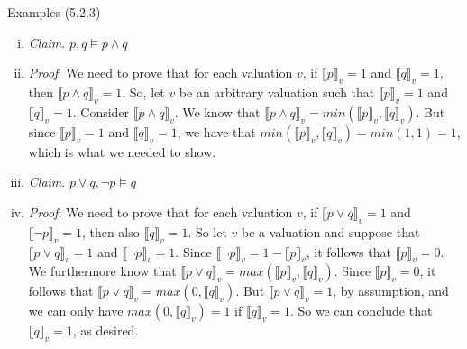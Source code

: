 \documentclass[../slides.tex]{subfiles}
\begin{document}
\begin{frame}{Examples (5.2.3)}

	\begin{enumerate}[(i)]
		
			\item \emph{Claim}. $p,q\vDash p\land q$
			
			\item[] \emph{Proof}: We need to prove that for each valuation $v$, if $\llbracket p\rrbracket_v=1$ and $\llbracket q\rrbracket_v=1$, then $\llbracket p\land q\rrbracket_v=1$. So, let $v$ be an arbitrary valuation such that $\llbracket p\rrbracket_v=1$ and $\llbracket q\rrbracket_v=1$. Consider $\llbracket p\land q\rrbracket_v$. We know that $\llbracket p\land q\rrbracket_v=min(\llbracket p\rrbracket_v, \llbracket q\rrbracket_v)$. But since $\llbracket p\rrbracket_v=1$ and $\llbracket q\rrbracket_v=1$, we have that $min(\llbracket p\rrbracket_v, \llbracket q\rrbracket_v)=min(1,1)=1$, which is what we needed to show.
		
		\setcounter{enumi}{3}
		\item \emph{Claim}. $p\lor q, \neg p\vDash q$
			
		\item[] \emph{Proof}: We need to prove that for each valuation $v$, if $\llbracket p\lor q\rrbracket_v=1$ and $\llbracket \neg p\rrbracket_v=1$, then also $\llbracket q\rrbracket_v=1$. So let $v$ be a valuation and suppose that $\llbracket p\lor q\rrbracket_v=1$ and $\llbracket \neg p\rrbracket_v=1$. Since $\llbracket \neg p\rrbracket_v=1-\llbracket p\rrbracket_v$, it follows that $\llbracket p\rrbracket_v=0$. We furthermore know that $\llbracket p\lor q\rrbracket_v=max(\llbracket p\rrbracket_v, \llbracket q\rrbracket_v)$. Since  $\llbracket p\rrbracket_v=0$, it follows that $\llbracket p\lor q\rrbracket_v=max(0, \llbracket q\rrbracket_v)$. But $\llbracket p\lor q\rrbracket_v=1$, by assumption, and we can only have $max(0, \llbracket q\rrbracket_v)=1$ if $\llbracket q\rrbracket_v=1$. So we can conclude that $\llbracket q\rrbracket_v=1$, as desired.


\end{enumerate}

\end{frame}
\end{document}
